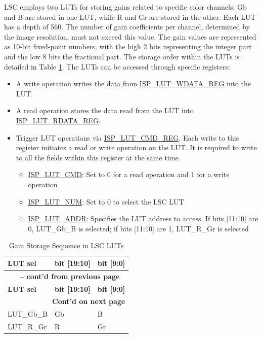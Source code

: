 \documentclass[main\_\_EN.tex]{subfiles}
\begin{document}
LSC employs two LUTs for storing gains related to specific color channels: Gb and B are stored in one LUT, while R and Gr are stored in the other. Each LUT has a depth of 560. The number of gain coefficients per channel, determined by the image resolution, must not exceed this value. The gain values are represented as 10-bit fixed-point numbers, with the high 2 bits representing the integer part and the low 8 bits the fractional part. The storage order within the LUTs is detailed in Table \ref{tab:lsc_lut_order}. The LUTs can be accessed through specific registers:
\begin{itemize}
    \item A write operation writes the data from \hyperref[regdesc:ISPLUTWDATAREG]{ISP\_LUT\_WDATA\_REG} into the LUT.
    \item A read operation stores the data read from the LUT into \hyperref[regdesc:ISPLUTRDATAREG]{ISP\_LUT\_RDATA\_REG}.
    \item Trigger LUT operations via \hyperref[regdesc:ISPLUTCMDREG]{ISP\_LUT\_CMD\_REG}. Each write to this register initiates a read or write operation on the LUT. It is required to write to all the fields within this register at the same time.
    \begin{itemize}
        \item \hyperref[fielddesc:ISPLUTCMD]{ISP\_LUT\_CMD}: Set to 0 for a read operation and 1 for a write operation
        \item \hyperref[fielddesc:ISPLUTNUM]{ISP\_LUT\_NUM}: Set to 0 to select the LSC LUT
        \item \hyperref[fielddesc:ISPLUTADDR]{ISP\_LUT\_ADDR}: Specifies the LUT address to access. If bits [11:10] are 0, LUT\_Gb\_B is selected; if bits [11:10] are 1, LUT\_R\_Gr is selected
    \end{itemize}
\end{itemize}

\begin{longtable}[c]{ |p{5cm}|p{3cm}|p{3cm}| }
    \caption{Gain Storage Sequence in LSC LUTs}
    \label{tab:lsc_lut_order}\\\hline

    \rowcolor{lightgray}
    \textbf{LUT sel} & \textbf{bit [19:10]} & \textbf{bit [9:0]} \\\hline
    \endfirsthead

    \multicolumn{3}{c}{\bfseries \tablename\ \thetable{} -- cont'd from previous page}\\\hline
    \rowcolor{lightgray}
    \textbf{LUT sel} & \textbf{bit [19:10]} & \textbf{bit [9:0]} \\\hline
    \endhead

    \multicolumn{3}{r}{\textbf{Cont'd on next page}} \\
    \endfoot

    \endlastfoot

        LUT\_Gb\_B & Gb & B \\\hline
        LUT\_R\_Gr & R & Gr \\\hline

\end{longtable}
\end{document}
